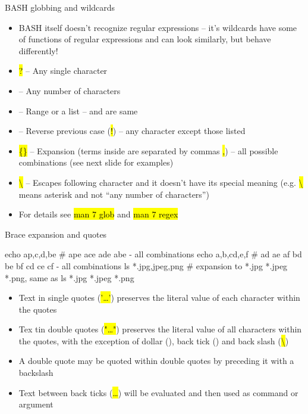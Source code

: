 \documentclass[compress, ucs, xelatex, 11pt, xcolor=svgnames,
  hyperref={
    bookmarks=true,
    unicode=true,
    colorlinks=true,
    pdftitle={Linux, command line and MetaCentrum},
    plainpages=false,
    pdfauthor={Vojtech Zeisek},
    pdfsubject={Course about use of Linux command line, writing shell scripts and using MetaCentrum of CESNET},
    pdfcreator={XeLaTeX},
    pdfkeywords={Linux, GNU, BASH, shell, command line, MetaCentrum},
    linkcolor=Red,
    anchorcolor=Blue,
    citecolor=Purple,
    filecolor=DodgerBlue,
    menucolor=DarkOrchid,
    urlcolor=DeepSkyBlue,
    pdftex},
  url={hyphens, lowtilde} %
  ]{beamer}
\renewcommand{\texttt}[1]{\hl{\ttfamily #1}}
\begin{document}
\begin{frame}{BASH globbing and wildcards}
\begin{itemize}
  \item BASH itself doesn't recognize regular expressions -- it's wildcards have some of functions of regular expressions and can look similarly, but behave differently!
  \item \texttt{?} -- Any single character
  \item \texttt{*} -- Any number of characters
  \item \texttt{[]} -- Range or a list -- \texttt{[abcdef]} and \texttt{[a-f]} are same
  \item \texttt{[!\ldots]} -- Reverse previous case (\texttt{!}) -- any character except those listed
  \item \texttt{\{\}} -- Expansion (terms inside are separated by commas \texttt{,}) -- all possible combinations (see next slide for examples)
  \item \texttt{\textbackslash} -- Escapes following character and it doesn't have its special meaning (e.g. \texttt{\textbackslash *} means asterisk \texttt{*} and not ``any number of characters'')
  \item For details see \texttt{man 7 glob} and \texttt{man 7 regex}
\end{itemize}
\end{frame}

\begin{frame}[fragile]{Brace expansion and quotes}
  \begin{bashcode}
    echo a{p,c,d,b}e # ape ace ade abe - all combinations
    echo {a,b,c}{d,e,f} # ad ae af bd be bf cd ce cf - all combinations
    ls *.{jpg,jpeg,png} # expansion to *.jpg *.jpeg *.png, same as
    ls *.jpg *.jpeg *.png
  \end{bashcode}
\begin{itemize}
  \item Text in single quotes (\texttt{'\ldots'}) preserves the literal value of each character within the quotes
  \item Tex tin double quotes (\texttt{"\ldots"}) preserves the literal value of all characters within the quotes, with the exception of dollar (\texttt{\textdollar}), back tick (\texttt{\textasciigrave}) and back slash (\texttt{\textbackslash})
  \item A double quote may be quoted within double quotes by preceding it with a backslash
  \item Text between back ticks (\texttt{\textasciigrave\ldots\textasciigrave}) will be evaluated and then used as command or argument
\end{itemize}
\end{frame}
\end{document}
